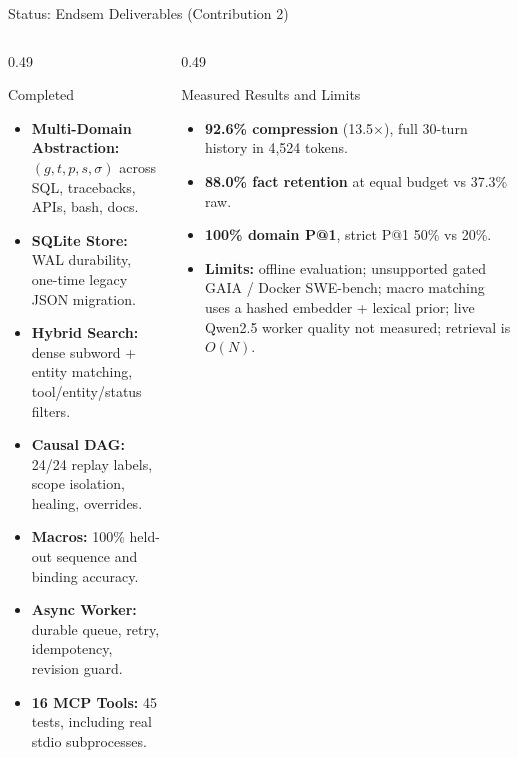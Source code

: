 \documentclass[aspectratio=169,10pt]{beamer}
\begin{document}
\begin{frame}{Status: Endsem Deliverables (Contribution 2)}
  \begin{columns}[T,onlytextwidth]
    \begin{column}{0.49\textwidth}
      \begin{block}{Completed}
        \begin{itemize}
          \footnotesize
          \item \textbf{Multi-Domain Abstraction:} $(g, t, p, s, \sigma)$ across SQL, tracebacks, APIs, bash, docs.
          \item \textbf{SQLite Store:} WAL durability, one-time legacy JSON migration.
          \item \textbf{Hybrid Search:} dense subword + entity matching, tool/entity/status filters.
          \item \textbf{Causal DAG:} 24/24 replay labels, scope isolation, healing, overrides.
          \item \textbf{Macros:} 100\% held-out sequence and binding accuracy.
          \item \textbf{Async Worker:} durable queue, retry, idempotency, revision guard.
          \item \textbf{16 MCP Tools:} 45 tests, including real stdio subprocesses.
        \end{itemize}
      \end{block}
    \end{column}
    \begin{column}{0.49\textwidth}
      \begin{block}{Measured Results and Limits}
        \begin{itemize}
          \footnotesize
          \item \textbf{92.6\% compression} (13.5$\times$), full 30-turn history in 4,524 tokens.
          \item \textbf{88.0\% fact retention} at equal budget vs 37.3\% raw.
          \item \textbf{100\% domain P@1}, strict P@1 50\% vs 20\%.
          \item \textbf{Limits:} offline evaluation; unsupported gated GAIA / Docker SWE-bench; macro matching uses a hashed embedder + lexical prior; live Qwen2.5 worker quality not measured; retrieval is $O(N)$.
        \end{itemize}
      \end{block}
    \end{column}
  \end{columns}
\end{frame}
\end{document}
